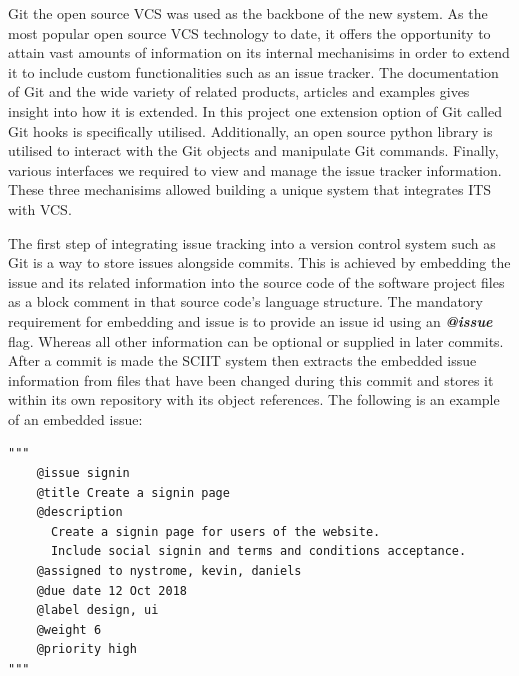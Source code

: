 \documentclass{mproj}
\newenvironment{code}{\captionsetup{type=listing}}{}
\begin{document}

Git the open source VCS was used as the backbone of the new system. As the most popular open source VCS  technology to date, it offers the opportunity to attain vast amounts of information on its internal mechanisims in order to extend it to include custom functionalities such as an issue tracker. The documentation of Git and the wide variety of related products, articles and examples gives insight into how it is extended. In this project one extension option of Git called Git hooks is specifically utilised. Additionally, an open source python library is utilised to interact with the Git objects and manipulate Git commands. Finally, various interfaces we required to view and manage the issue tracker information. These three mechanisims allowed building a unique system that integrates ITS with VCS.


The first step of integrating issue tracking into a version control system such as Git is a way to store issues alongside commits. This is achieved by embedding the issue and its related information into the source code of the software project files as a block comment in that source code's language structure. The mandatory requirement for embedding and issue is to provide an issue id using an \textbf{\textit{@issue}} flag. Whereas all other information can be optional or supplied in later commits. After a commit is made the SCIIT system then extracts the embedded issue information from files that have been changed during this commit and stores it within its own repository with its object references. The following is an example of an embedded issue:

\begin{code}
\begin{verbatim}
"""
    @issue signin
    @title Create a signin page
    @description
      Create a signin page for users of the website. 
      Include social signin and terms and conditions acceptance.
    @assigned to nystrome, kevin, daniels
    @due date 12 Oct 2018
    @label design, ui
    @weight 6
    @priority high    
"""
\end{verbatim}
\end{code}

\end{document}
